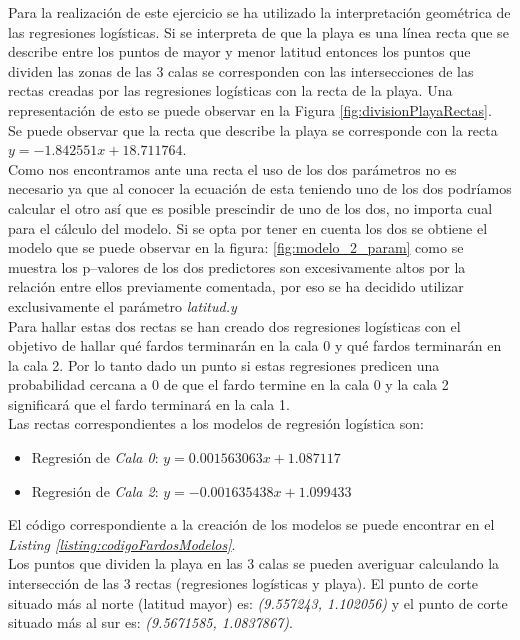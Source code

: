 \documentclass{article}
\begin{document}
Para la realización de este ejercicio se ha utilizado la interpretación geométrica de las regresiones logísticas. Si se interpreta de que la playa es una línea recta que se describe entre los puntos de mayor y menor latitud entonces los puntos que dividen las zonas de las 3 calas se corresponden con las intersecciones de las rectas creadas por las regresiones logísticas con la recta de la playa. Una representación de esto se puede observar en la Figura \ref{fig:divisionPlayaRectas}.\\
Se puede observar que la recta que describe la playa se corresponde con la recta $y = -1.842551x + 18.711764$.\\

Como nos encontramos ante una recta el uso de los dos parámetros no es necesario ya que al conocer la ecuación de esta teniendo uno de los dos podríamos calcular el otro así que es posible prescindir de uno de los dos, no importa cual para el cálculo del modelo. Si se opta por tener en cuenta los dos se obtiene el modelo que se puede observar en la figura: \ref{fig:modelo_2_param} como se muestra los p--valores de los dos predictores son excesivamente altos por la relación entre ellos previamente comentada, por eso se ha decidido utilizar exclusivamente el parámetro \textit{latitud.y}\\

Para hallar estas dos rectas se han creado dos regresiones logísticas con el objetivo de hallar qué fardos terminarán en la cala 0 y qué fardos terminarán en la cala 2. Por lo tanto dado un punto si estas regresiones predicen una probabilidad cercana a 0 de que el fardo termine en la cala 0 y la cala 2 significará que el fardo terminará en la cala 1.\\

Las rectas correspondientes a los modelos de regresión logística son:
\begin{itemize}
    \item Regresión de \textit{Cala 0}: $y = 0.001563063x + 1.087117$
    \item Regresión de \textit{Cala 2}: $y = -0.001635438x + 1.099433$
\end{itemize}

El código correspondiente a la creación de los modelos se puede encontrar en el \textit{Listing \ref{listing:codigoFardosModelos}}.\\

Los puntos que dividen la playa en las 3 calas se pueden averiguar calculando la intersección de las 3 rectas (regresiones logísticas y playa). El punto de corte situado más al norte (latitud mayor) es: \textit{(9.557243, 1.102056)} y el punto de corte situado más al sur es: \textit{(9.5671585, 1.0837867)}.\\
\end{document}
